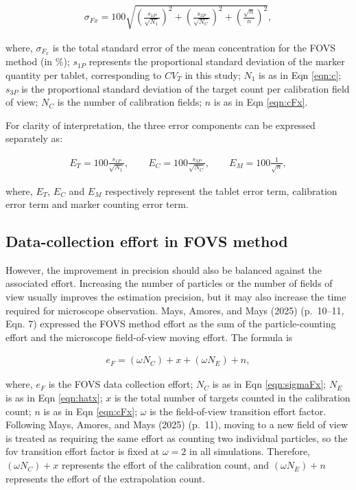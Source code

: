 \documentclass[
  12pt,
]{article}
\begin{document}
\begin{align}
\label{eqn:sigmaFx} \sigma_{Fx} = 100 \sqrt{\left(\frac{s_{1P}}{\sqrt{N_1}}\right)^2 + \left(\frac{s_{3P}}{\sqrt{N_{C}}}\right)^2 + \left(\frac{\sqrt{n}}{n}\right)^2},
\end{align}

where, \(\sigma_{F_x}\) is the total standard error of the mean
concentration for the FOVS method (in \%); \(s_{1P}\) represents the
proportional standard deviation of the marker quantity per tablet,
corresponding to \(CV_T\) in this study; \(N_1\) is as in Eqn
\eqref{eqn:c}; \(s_{3P}\) is the proportional standard deviation of the
target count per calibration field of view; \(N_C\) is the number of
calibration fields; \(n\) is as in Eqn \eqref{eqn:cFx}.

For clarity of interpretation, the three error components can be
expressed separately as:

\begin{align}
\label{eqn:error_term} E_T=100\frac{s_{1P}}{\sqrt{N_1}}, \qquad E_C=100\frac{s_{3P}}{\sqrt{N_C}}, \qquad E_M=100\frac{1}{\sqrt{n}}, 
\end{align}

where, \(E_T\), \(E_C\) and \(E_M\) respectively represent the tablet
error term, calibration error term and marker counting error term.

\subsection{Data-collection effort in FOVS
method}\label{data-collection-effort-in-fovs-method}

However, the improvement in precision should also be balanced against
the associated effort. Increasing the number of particles or the number
of fields of view usually improves the estimation precision, but it may
also increase the time required for microscope observation. Mays,
Amores, and Mays (2025) (p.~10--11, Eqn. 7) expressed the FOVS method
effort as the sum of the particle-counting effort and the microscope
field-of-view moving effort. The formula is

\begin{align}
\label{eqn:eF} e_F=(\omega N_C)+x+(\omega N_E)+n, 
\end{align}

where, \(e_F\) is the FOVS data collection effort; \(N_C\) is as in Eqn
\eqref{eqn:sigmaFx}; \(N_E\) is as in Eqn \eqref{eqn:hatx}; \(x\) is the
total number of targets counted in the calibration count; \(n\) is as in
Eqn \eqref{eqn:cFx}; \(\omega\) is the field-of-view transition effort
factor. Following Mays, Amores, and Mays (2025) (p.~11), moving to a new
field of view is treated as requiring the same effort as counting two
individual particles, so the fov transition effort factor is fixed at
\(\omega=2\) in all simulations. Therefore, \((\omega N_C) + x\)
represents the effort of the calibration count, and \((\omega N_E) + n\)
represents the effort of the extrapolation count.
\end{document}
